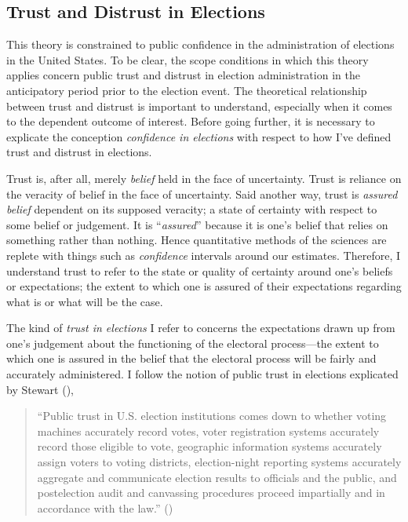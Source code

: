 \documentclass[
  12pt,
  letterpaper,
]{article}
\begin{document}
\subsection{Trust and Distrust in
Elections}\label{trust-and-distrust-in-elections}

This theory is constrained to public confidence in the administration of
elections in the United States. To be clear, the scope conditions in
which this theory applies concern public trust and distrust in election
administration in the anticipatory period prior to the election event.
The theoretical relationship between trust and distrust is important to
understand, especially when it comes to the dependent outcome of
interest. Before going further, it is necessary to explicate the
conception \emph{confidence in elections} with respect to how I've
defined trust and distrust in elections.

Trust is, after all, merely \emph{belief} held in the face of
uncertainty. Trust is reliance on the veracity of belief in the face of
uncertainty. Said another way, trust is \emph{assured belief} dependent
on its supposed veracity; a state of certainty with respect to some
belief or judgement. It is ``\emph{assured}'' because it is one's belief
that relies on something rather than nothing. Hence quantitative methods
of the sciences are replete with things such as \emph{confidence}
intervals around our estimates. Therefore, I understand trust to refer
to the state or quality of certainty around one's beliefs or
expectations; the extent to which one is assured of their expectations
regarding what is or what will be the case.

The kind of \emph{trust in elections} I refer to concerns the
expectations drawn up from one's judgement about the functioning of the
electoral process---the extent to which one is assured in the belief
that the electoral process will be fairly and accurately administered. I
follow the notion of public trust in elections explicated by Stewart
(),

\begin{quote}
``Public trust in U.S. election institutions comes down to whether
voting machines accurately record votes, voter registration systems
accurately record those eligible to vote, geographic information systems
accurately assign voters to voting districts, election-night reporting
systems accurately aggregate and communicate election results to
officials and the public, and postelection audit and canvassing
procedures proceed impartially and in accordance with the law.''
()
\end{quote}
\end{document}
